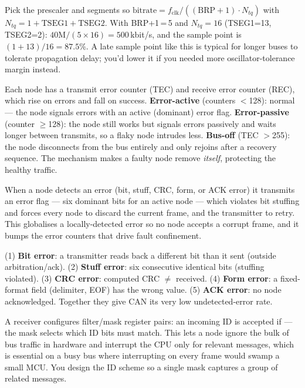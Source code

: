 Pick the prescaler and segments so
$\text{bitrate} = f_{\text{clk}} / ((\text{BRP}+1)\cdot N_{tq})$ with
$N_{tq}=1+\text{TSEG1}+\text{TSEG2}$. With BRP+1\,=\,5 and $N_{tq}=16$ (TSEG1=13,
TSEG2=2): $40\text{M}/(5\times16) = 500$\,kbit/s, and the sample point is
$(1+13)/16 = 87.5\%$. A late sample point like this is typical for longer buses
to tolerate propagation delay; you'd lower it if you needed more
oscillator-tolerance margin instead.

Each node has a transmit error counter (TEC) and receive error counter (REC),
which rise on errors and fall on success. \textbf{Error-active} (counters
$<$128): normal --- the node signals errors with an active (dominant) error
flag. \textbf{Error-passive} (counter $\geq$128): the node still works but
signals errors passively and waits longer between transmits, so a flaky node
intrudes less. \textbf{Bus-off} (TEC $>$255): the node disconnects from the bus
entirely and only rejoins after a recovery sequence. The mechanism makes a
faulty node remove \emph{itself}, protecting the healthy traffic.

When a node detects an error (bit, stuff, CRC, form, or ACK error) it transmits
an error flag --- six dominant bits for an active node --- which violates bit
stuffing and forces every node to discard the current frame, and the
transmitter to retry. This globalises a locally-detected error so no node
accepts a corrupt frame, and it bumps the error counters that drive fault
confinement.

(1) \textbf{Bit error}: a transmitter reads back a different bit than it sent
(outside arbitration/ack). (2) \textbf{Stuff error}: six consecutive identical
bits (stuffing violated). (3) \textbf{CRC error}: computed CRC $\neq$ received.
(4) \textbf{Form error}: a fixed-format field (delimiter, EOF) has the wrong
value. (5) \textbf{ACK error}: no node acknowledged. Together they give CAN its
very low undetected-error rate.

A receiver configures filter/mask register pairs: an incoming ID is accepted if
 --- the mask selects which ID bits must
match. This lets a node ignore the bulk of bus traffic in hardware and interrupt
the CPU only for relevant messages, which is essential on a busy bus where
interrupting on every frame would swamp a small MCU. You design the ID scheme so
a single mask captures a group of related messages.


